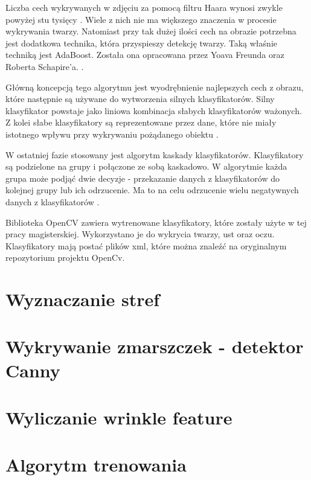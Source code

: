 \documentclass[a4paper,twoside,12pt]{book}
\begin{document}
    Liczba cech wykrywanych w zdjęciu za
    pomocą filtru Haara wynosi zwykle powyżej stu tysięcy \cite{violaJones}.
    Wiele z nich nie ma
    większego znaczenia w procesie wykrywania twarzy.
    Natomiast przy tak dużej ilości cech na obrazie potrzebna jest dodatkowa
    technika, która przyspieszy detekcję twarzy.
    Taką właśnie techniką jest AdaBoost.
    Została ona opracowana
    przez Yoava Freunda oraz Roberta Schapire'a. \cite{dataMiningInferencePrediction}.

    Główną koncepcją tego algorytmu jest wyodrębnienie najlepszych cech z obrazu, które następnie są używane do
    wytworzenia silnych klasyfikatorów.
    Silny klasyfikator powstaje jako liniowa kombinacja słabych
    klasyfikatorów ważonych.
    Z kolei słabe klasyfikatory są reprezentowane przez dane, które nie miały istotnego wpływu przy wykrywaniu pożądanego
    obiektu \cite{dataMiningInferencePrediction}.

    W ostatniej fazie stosowany jest algorytm kaskady klasyfikatorów.
    Klasyfikatory są podzielone na grupy i
    połączone ze sobą kaskadowo.
    W algorytmie każda grupa może podjąć dwie decyzje - przekazanie danych z klasyfikatorów
    do kolejnej grupy lub ich odrzucenie.
    Ma to na celu odrzucenie wielu negatywnych danych z klasyfikatorów \cite{cascade}.

    Biblioteka OpenCV zawiera wytrenowane klasyfikatory, które zostały użyte w tej pracy magisterskiej.
    Wykorzystano
    je do wykrycia twarzy, ust oraz oczu.
    Klasyfikatory mają postać plików xml, które można znaleźć na oryginalnym
    repozytorium projektu OpenCv.

    \section{Wyznaczanie stref}\label{sec:wyznaczanieStref}

    \section{Wykrywanie zmarszczek - detektor Canny}\label{sec:wykrywanieZmarszczek}

    \section{Wyliczanie wrinkle feature}\label{sec:wyliczanieWrinkleFeature}

    \section{Algorytm trenowania}\label{sec:algorytmTrenowania}
\end{document}
